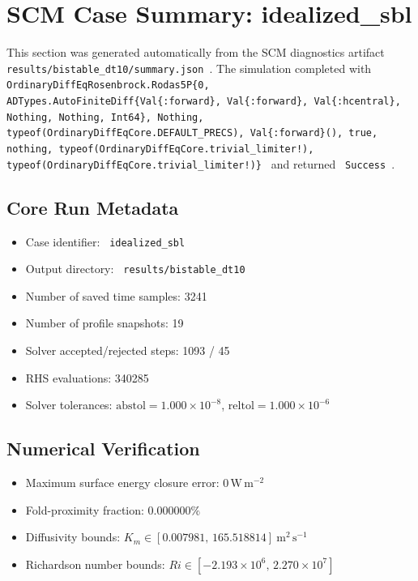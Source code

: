 \section{SCM Case Summary: idealized\_sbl}
\label{sec:scm_case_idealized_sbl}

This section was generated automatically from the SCM diagnostics artifact
\texttt{ results/bistable\_dt10/summary.json }. The simulation completed with \texttt{ OrdinaryDiffEqRosenbrock.Rodas5P\{0, ADTypes.AutoFiniteDiff\{Val\{:forward\}, Val\{:forward\}, Val\{:hcentral\}, Nothing, Nothing, Int64\}, Nothing, typeof(OrdinaryDiffEqCore.DEFAULT\_PRECS), Val\{:forward\}(), true, nothing, typeof(OrdinaryDiffEqCore.trivial\_limiter!), typeof(OrdinaryDiffEqCore.trivial\_limiter!)\} }
and returned \texttt{ Success }.

\subsection{Core Run Metadata}
\begin{itemize}
  \item Case identifier: \texttt{ idealized\_sbl }
  \item Output directory: \texttt{ results/bistable\_dt10 }
  \item Number of saved time samples: 3241
  \item Number of profile snapshots: 19
  \item Solver accepted/rejected steps: 1093 / 45
  \item RHS evaluations: 340285
  \item Solver tolerances: $\mathrm{abstol}=1.000 \times 10^{-8}$, $\mathrm{reltol}=1.000 \times 10^{-6}$
\end{itemize}

\subsection{Numerical Verification}
\begin{itemize}
  \item Maximum surface energy closure error:
  $0\,\mathrm{W\,m^{-2}}$
  \item Fold-proximity fraction:
  $0.000000\%$
  \item Diffusivity bounds:
  $K_m \in [0.007981,\,165.518814]~\mathrm{m^2\,s^{-1}}$
  \item Richardson number bounds:
  $Ri \in [-2.193 \times 10^{6},\,2.270 \times 10^{7}]$
\end{itemize}

